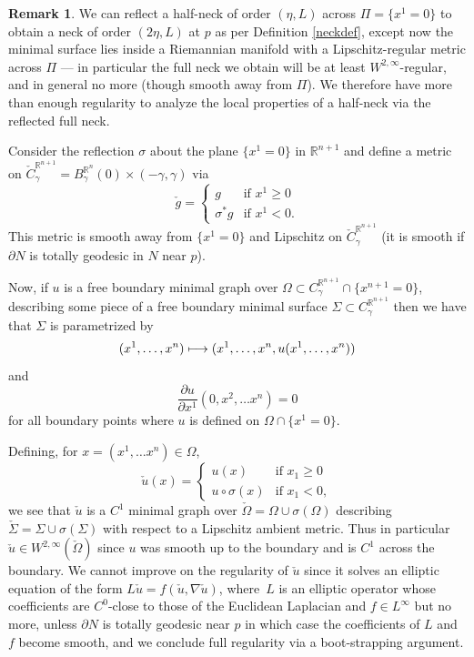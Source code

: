 \documentclass[JEP,XML,SOM,Unicode]{cedram}
\newcounter{cas}
\newcommand{\mto}{\mathchoice{\longmapsto}{\mapsto}{\mapsto}{\mapsto}}
\theoremstyle{definition}
\newtheorem{rmk}[thm]{Remark}
\newcommand{\R}{\mathbb{R}}
\let\D\nabla
\begin{document}
\begin{rmk}\label{rmk_reflection}
We can reflect a half-neck of order $(\eta, L)$ across $\Pi=\{x^1 =0\}$ to obtain a neck of order $(2\eta, L)$ at $p$ as per Definition \ref{neckdef}, except now the minimal surface lies inside a Riemannian manifold with a Lipschitz-regular metric across $\Pi$ --- in particular the full neck we obtain will be at least $W^{2,\infty}$-regular, and in general no more (though smooth away from $\Pi$). We therefore have more than enough regularity to analyze the local properties of a half-neck via the reflected full neck.

Consider the reflection $\sigma$ about the plane $\{x^1=0\}$ in $\R^{n+1}$ and define a metric on $\check{C}^{\R^{n+1}}_{\gamma}=B_\gamma^{\R^n}(0)\times (-\gamma,\gamma)$ via
$$
\check{g} = \begin{cases}
g&\text{if }x^1\geq 0\\
\sigma^{\ast}g&\text{if }x^1<0.
\end{cases}
$$
This metric is smooth away from $\{x^1=0\}$ and Lipschitz on $\check{C}^{\R^{n+1}}_{\gamma}$ (it is smooth if $\partial N$ is totally geodesic in $N$ near $p$).

Now, if $u$ is a free boundary minimal graph over $\Omega \subset C^{\R^{n+1}}_{\gamma}\cap \{x^{n+1}=0\}$, describing some piece of a free boundary minimal surface $\Sigma \subset C^{\R^{n+1}}_{\gamma}$ then we have that $\Sigma$ is parametrized by
$$(x^1,\dots,x^n)\mto (x^1,\dots, x^n, u(x^1,\dots , x^n))$$
and
$$\frac{\partial u}{\partial x^1}(0,x^2,\dots x^n) = 0$$
for all boundary points where $u$ is defined \ie on $\Omega\cap \{x^1 = 0\}$.

Defining, for $x=(x^1,\dots x^n)\in \Omega$,
$$
\check{u}(x) =\begin{cases}
u(x)&\text{if }x_1\geq 0\\
u\circ \sigma (x)&\text{if }x_1<0,
\end{cases}
$$
we see that $\check{u}$ is a $C^1$ minimal graph over $\check{\Omega}=\Omega\cup \sigma(\Omega)$ describing $\check{\Sigma} = \Sigma\cup \sigma(\Sigma)$ with respect to a Lipschitz ambient metric. Thus in particular $\check{u}\in W^{2,\infty} (\check{\Omega})$ since $u$ was smooth up to the boundary and is $C^1$ across the boundary. We cannot improve on the regularity of $\check{u}$ since it solves an elliptic equation of the form $L\check{u}=f(\check{u},\D \check{u})$, where~$L$ is an elliptic operator whose coefficients are $C^0$-close to those of the Euclidean Laplacian and $f\in L^\infty$ but no more, unless $\partial N$ is totally geodesic near $p$ in which case the coefficients of $L$ and $f$ become smooth, and we conclude full regularity via a boot-strapping argument.
\end{rmk}
\end{document}
